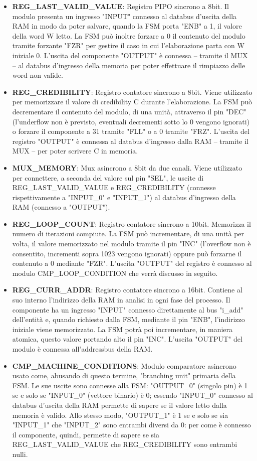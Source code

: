 \documentclass[a4paper]{article}
\begin{document}
\begin{itemize}
    \item \textbf{REG\_LAST\_VALID\_VALUE}: Registro PIPO sincrono a 8bit. Il modulo presenta un ingresso "INPUT" connesso al databus d’uscita della RAM in modo da poter salvare, quando la FSM porta "ENB" a 1, il valore della word W letto. La FSM può inoltre forzare a 0 il contenuto del modulo tramite forzante "FZR" per gestire il caso in cui l’elaborazione parta con W iniziale 0. L’uscita del componente "OUTPUT" è connessa – tramite il MUX – al databus d’ingresso della memoria per poter effettuare il rimpiazzo delle word non valide.
    \item \textbf{REG\_CREDIBILITY}: Registro contatore sincrono a 8bit. Viene utilizzato per memorizzare il valore di credibility C durante l’elaborazione. La FSM può decrementare il contenuto del modulo, di una unità, attraverso il pin "DEC" (l’underflow non è previsto, eventuali decrementi sotto lo 0 vengono ignorati) o forzare il componente a 31 tramite "FLL" o a 0 tramite "FRZ". L’uscita del registro "OUTPUT" è connessa al databus d’ingresso dalla RAM – tramite il MUX – per poter scrivere C in memoria.
    \item \textbf{MUX\_MEMORY}: Mux asincrono a 8bit da due canali. Viene utilizzato per connettere, a seconda del valore sul pin "SEL", le uscite di REG\_LAST\_VALID\_VALUE e REG\_CREDIBILITY (connesse rispettivamente a "INPUT\_0" e "INPUT\_1") al databus d’ingresso della RAM (connesso a "OUTPUT").
    \item \textbf{REG\_LOOP\_COUNT}: Registro contatore sincrono a 10bit. Memorizza il numero di iterazioni compiute. La FSM può incrementare, di una unità per volta, il valore memorizzato nel modulo tramite il pin "INC" (l’overflow non è consentito, incrementi sopra 1023 vengono ignorati) oppure può forzarne il contenuto a 0 mediante "FZR". L’uscita "OUTPUT" del registro è connesso al modulo CMP\_LOOP\_CONDITION che verrà discusso in seguito.
    \item \textbf{REG\_CURR\_ADDR}: Registro contatore sincrono a 16bit. Contiene al suo interno l’indirizzo della RAM in analisi in ogni fase del processo. Il componente ha un ingresso "INPUT" connesso direttamente al bus "i\_add" dell’entità e, quando richiesto dalla FSM, mediante il pin "ENB", l’indirizzo iniziale viene memorizzato. La FSM potrà poi incrementare, in maniera atomica, questo valore portando alto il pin "INC". L’uscita "OUTPUT" del modulo è connessa all’addressbus della RAM.
    \item \textbf{CMP\_MACHINE\_CONDITIONS}: Modulo comparatore asincrono usato come, abusando di questo termine, "branching unit" primaria della FSM. Le sue uscite sono connesse alla FSM: "OUTPUT\_0" (singolo pin) è 1 se e solo se "INPUT\_0" (vettore binario) è 0; essendo "INPUT\_0" connesso al databus d’uscita della RAM permette di sapere se il valore letto dalla memoria è valido. Allo stesso modo, "OUTPUT\_1" è 1 se e solo se sia "INPUT\_1" che "INPUT\_2" sono entrambi diversi da 0: per come è connesso il componente, quindi, permette di sapere se sia REG\_LAST\_VALID\_VALUE che REG\_CREDIBILITY sono entrambi nulli.

\end{itemize}
\end{document}
